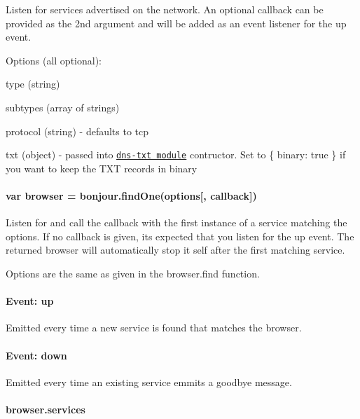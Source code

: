 Listen for services advertised on the network. An optional callback can be provided as the 2nd argument and will be added as an event listener for the {\ttfamily up} event.

Options (all optional)\+:


\begin{DoxyItemize}
\item {\ttfamily type} (string)
\item {\ttfamily subtypes} (array of strings)
\item {\ttfamily protocol} (string) -\/ defaults to {\ttfamily tcp}
\item {\ttfamily txt} (object) -\/ passed into \href{https://github.com/watson/dns-txt}{\tt dns-\/txt module} contructor. Set to {\ttfamily \{ binary\+: true \}} if you want to keep the T\+XT records in binary
\end{DoxyItemize}

\paragraph*{{\ttfamily var browser = bonjour.\+find\+One(options\mbox{[}, callback\mbox{]})}}

Listen for and call the {\ttfamily callback} with the first instance of a service matching the {\ttfamily options}. If no {\ttfamily callback} is given, it\textquotesingle{}s expected that you listen for the {\ttfamily up} event. The returned {\ttfamily browser} will automatically stop it self after the first matching service.

Options are the same as given in the {\ttfamily browser.\+find} function.

\paragraph*{{\ttfamily Event\+: up}}

Emitted every time a new service is found that matches the browser.

\paragraph*{{\ttfamily Event\+: down}}

Emitted every time an existing service emmits a goodbye message.

\paragraph*{{\ttfamily browser.\+services}}

